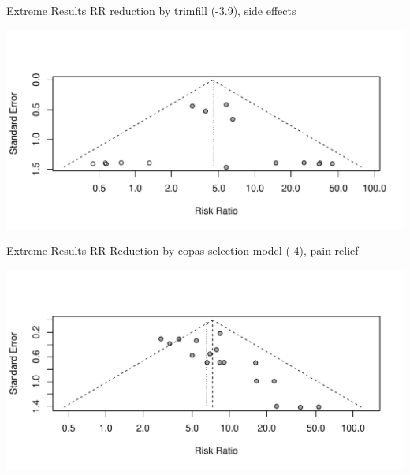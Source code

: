 \documentclass[english]{beamer}\usepackage[]{graphicx}\usepackage[]{color}
\makeatletter
\def\maxwidth{ %
  \ifdim\Gin@nat@width>\linewidth
    \linewidth
  \else
    \Gin@nat@width
  \fi
}
\newenvironment{knitrout}{}{} %
\makeatother
\begin{document}
\begin{frame}[fragile]{Extreme Results}
RR reduction by trimfill (-3.9), side effects

\begin{knitrout}
\color{fgcolor}
\includegraphics[width=\maxwidth]{figure/unnamed-chunk-20-1} 

\end{knitrout}
\end{frame}

\begin{frame}[fragile]{Extreme Results}
RR Reduction by copas selection model (-4), pain relief

\begin{knitrout}
\color{fgcolor}
\includegraphics[width=\maxwidth]{figure/unnamed-chunk-21-1} 

\end{knitrout}
\end{frame}
\end{document}
